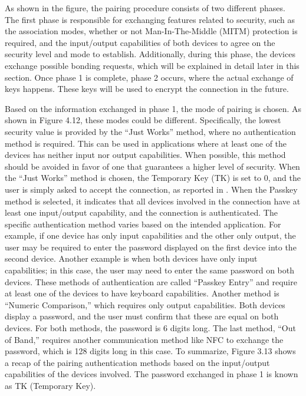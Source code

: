 \documentclass{Configuration_Files/PoliMi3i_thesis}
\begin{document}
As shown in the figure, the pairing procedure consists of two different phases. The first phase is responsible for exchanging features related to security, such as the association modes, whether or not Man-In-The-Middle (MITM) protection is required, and the input/output capabilities of both devices to agree on the security level and mode to establish. Additionally, during this phase, the devices exchange possible bonding requests, which will be explained in detail later in this section. Once phase 1 is complete, phase 2 occurs, where the actual exchange of keys happens. These keys will be used to encrypt the connection in the future.

Based on the information exchanged in phase 1, the mode of pairing is chosen. As shown in Figure 4.12, these modes could be different. Specifically, the lowest security value is provided by the “Just Works” method, where no authentication method is required. This can be used in applications where at least one of the devices has neither input nor output capabilities. When possible, this method should be avoided in favor of one that guarantees a higher level of security. When the “Just Works” method is chosen, the Temporary Key (TK) is set to 0, and the user is simply asked to accept the connection, as reported in \cite{nordic_academy}. When the Passkey method is selected, it indicates that all devices involved in the connection have at least one input/output capability, and the connection is authenticated. The specific authentication method varies based on the intended application. For example, if one device has only input capabilities and the other only output, the user may be required to enter the password displayed on the first device into the second device. Another example is when both devices have only input capabilities; in this case, the user may need to enter the same password on both devices. These methods of authentication are called “Passkey Entry” and require at least one of the devices to have keyboard capabilities. Another method is “Numeric Comparison,” which requires only output capabilities. Both devices display a password, and the user must confirm that these are equal on both devices. For both methods, the password is 6 digits long. The last method, “Out of Band,” requires another communication method like NFC to exchange the password, which is 128 digits long in this case. To summarize, Figure 3.13 shows a recap of the pairing authentication methods based on the input/output capabilities of the devices involved. The password exchanged in phase 1 is known as TK (Temporary Key).
\end{document}
